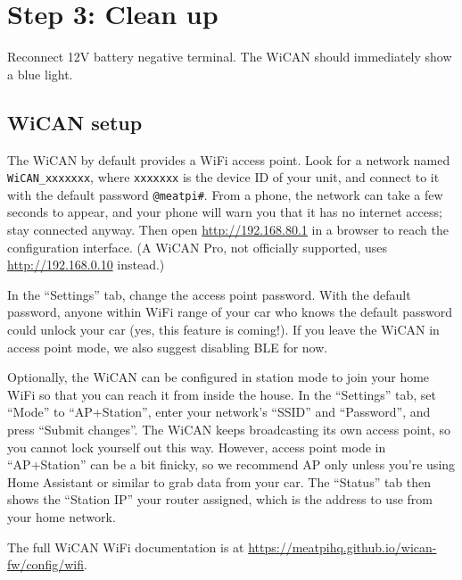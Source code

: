 \documentclass[superscriptaddress,onecolumn,floatfix]{revtex4-2}
\begin{document}
\section{Step 3: Clean up} \label{sect:3}
Reconnect 12V battery negative terminal. The WiCAN should immediately show a blue light.

\subsection{WiCAN setup}
The WiCAN by default provides a WiFi access point. Look for a network named \texttt{WiCAN\_xxxxxxx}, where \texttt{xxxxxxx} is the device ID of your unit, and connect to it with the default password \texttt{@meatpi\#}. From a phone, the network can take a few seconds to appear, and your phone will warn you that it has no internet access; stay connected anyway. Then open \href{http://192.168.80.1}{http://192.168.80.1} in a browser to reach the configuration interface. (A WiCAN Pro, not officially supported, uses \href{http://192.168.0.10}{http://192.168.0.10} instead.)

In the ``Settings'' tab, change the access point password. With the default password, anyone within WiFi range of your car who knows the default password could unlock your car (yes, this feature is coming!). If you leave the WiCAN in access point mode, we also suggest disabling BLE for now.

Optionally, the WiCAN can be configured in station mode to join your home WiFi so that you can reach it from inside the house. In the ``Settings'' tab, set ``Mode'' to ``AP+Station'', enter your network's ``SSID'' and ``Password'', and press ``Submit changes''. The WiCAN keeps broadcasting its own access point, so you cannot lock yourself out this way. However, access point mode in ``AP+Station'' can be a bit finicky, so we recommend AP only unless you're using Home Assistant or similar to grab data from your car. The ``Status'' tab then shows the ``Station IP'' your router assigned, which is the address to use from your home network.

The full WiCAN WiFi documentation is at \href{https://meatpihq.github.io/wican-fw/config/wifi}{https://meatpihq.github.io/wican-fw/config/wifi}.
\appendix 
\end{document}
